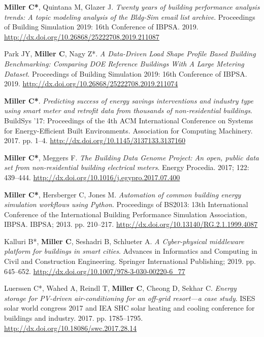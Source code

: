 \documentclass[10pt,a4paper]{article}
\begin{document}
\begin{small}
\begin{etaremune}
\item
\textbf{Miller C*}, Quintana M, Glazer J. \emph{Twenty years of building performance analysis trends: A topic modeling analysis of the Bldg-Sim email list archive}. Proceedings of Building Simulation 2019: 16th Conference of IBPSA. 2019. \url{http://dx.doi.org/10.26868/25222708.2019.211087}
\item
Park JY, \textbf{Miller C}, Nagy Z*. \emph{A Data-Driven Load Shape Profile Based Building Benchmarking: Comparing DOE Reference Buildings With A Large Metering Dataset}. Proceedings of Building Simulation 2019: 16th Conference of IBPSA. 2019. \url{http://dx.doi.org/10.26868/25222708.2019.211074}
\item
\textbf{Miller C*}. \emph{Predicting success of energy savings interventions and industry type using smart meter and retrofit data from thousands of non-residential buildings}. BuildSys '17: Proceedings of the 4th ACM International Conference on Systems for Energy-Efficient Built Environments. Association for Computing Machinery. 2017. pp. 1–4. \url{http://dx.doi.org/10.1145/3137133.3137160}
\item
\textbf{Miller C*}, Meggers F. \emph{The Building Data Genome Project: An open, public data set from non-residential building electrical meters}. Energy Procedia. 2017; 122: 439–444. \url{http://dx.doi.org/10.1016/j.egypro.2017.07.400}
\item
\textbf{Miller C*}, Hersberger C, Jones M. \emph{Automation of common building energy simulation workflows using Python}. Proceedings of BS2013: 13th International Conference of the International Building Performance Simulation Association, IBPSA. IBPSA; 2013. pp. 210–217. \url{http://dx.doi.org/10.13140/RG.2.1.1999.4087} %
\item
Kalluri B*, \textbf{Miller C}, Seshadri B, Schlueter A. \emph{A Cyber-physical middleware platform for buildings in smart cities}. Advances in Informatics and Computing in Civil and Construction Engineering. Springer International Publishing; 2019. pp. 645–652. \url{http://dx.doi.org/10.1007/978-3-030-00220-6_77}
\item
Luerssen C*, Wahed A, Reindl T, \textbf{Miller C}, Cheong D, Sekhar C. \emph{Energy storage for PV-driven air-conditioning for an off-grid resort—a case study}. ISES solar world congress 2017 and IEA SHC solar heating and cooling conference for buildings and industry. 2017. pp. 1785–1795. \url{http://dx.doi.org/10.18086/swc.2017.28.14}

\end{etaremune}
\end{small}
\end{document}
